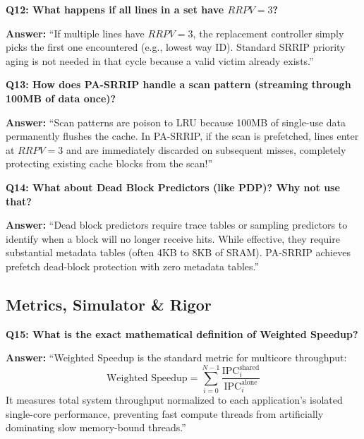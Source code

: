 \documentclass[11pt, a4paper]{article}
\begin{document}
\begin{trapbox}
\textbf{Q12: What happens if all lines in a set have $RRPV=3$?}
\end{trapbox}
\begin{answerbox}
\textbf{Answer:} ``If multiple lines have $RRPV=3$, the replacement controller simply picks the first one encountered (e.g., lowest way ID). Standard SRRIP priority aging is not needed in that cycle because a valid victim already exists.''
\end{answerbox}

\begin{trapbox}
\textbf{Q13: How does PA-SRRIP handle a scan pattern (streaming through 100MB of data once)?}
\end{trapbox}
\begin{answerbox}
\textbf{Answer:} ``Scan patterns are poison to LRU because 100MB of single-use data permanently flushes the cache. In PA-SRRIP, if the scan is prefetched, lines enter at $RRPV=3$ and are immediately discarded on subsequent misses, completely protecting existing cache blocks from the scan!''
\end{answerbox}

\begin{trapbox}
\textbf{Q14: What about Dead Block Predictors (like PDP)? Why not use that?}
\end{trapbox}
\begin{answerbox}
\textbf{Answer:} ``Dead block predictors require trace tables or sampling predictors to identify when a block will no longer receive hits. While effective, they require substantial metadata tables (often 4KB to 8KB of SRAM). PA-SRRIP achieves prefetch dead-block protection with zero metadata tables.''
\end{answerbox}

\subsection{Metrics, Simulator \& Rigor}

\begin{trapbox}
\textbf{Q15: What is the exact mathematical definition of Weighted Speedup?}
\end{trapbox}
\begin{answerbox}
\textbf{Answer:} ``Weighted Speedup is the standard metric for multicore throughput:
\begin{equation}
  \text{Weighted Speedup} = \sum_{i=0}^{N-1} \frac{\text{IPC}_{i}^{\text{shared}}}{\text{IPC}_{i}^{\text{alone}}}
\end{equation}
It measures total system throughput normalized to each application's isolated single-core performance, preventing fast compute threads from artificially dominating slow memory-bound threads.''
\end{answerbox}
\end{document}
